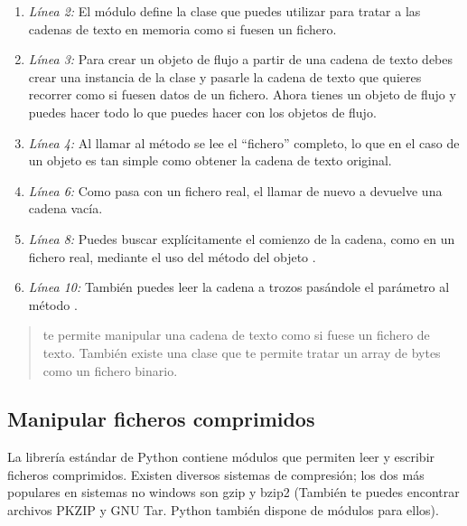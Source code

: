\begin{enumerate}

\item \emph{Línea 2:} El módulo  define la clase  que puedes utilizar para tratar a las cadenas de texto en memoria como si fuesen un fichero.

\item \emph{Línea 3:} Para crear un objeto de flujo a partir de una cadena de texto debes crear una instancia de la clase  y pasarle la cadena de texto que quieres recorrer como si fuesen datos de un fichero. Ahora tienes un objeto de flujo y puedes hacer todo lo que puedes hacer con los objetos de flujo.

\item \emph{Línea 4:} Al llamar al método  se lee el ``fichero'' completo, lo que en el caso de un objeto  es tan simple como obtener la cadena de texto original.

\item \emph{Línea 6:} Como pasa con un fichero real, el llamar de nuevo a  devuelve una cadena vacía.

\item \emph{Línea 8:} Puedes buscar explícitamente el comienzo de la cadena, como en un fichero real, mediante el uso del método  del objeto .

\item \emph{Línea 10:} También puedes leer la cadena a trozos pasándole el parámetro  al método .

\end{enumerate}

\begin{quote}
 te permite manipular una cadena de texto como si fuese un fichero de texto. También existe una clase  que te permite tratar un array de bytes como un fichero binario.
\end{quote}

\subsection{Manipular ficheros comprimidos}

La librería estándar de Python contiene módulos que permiten leer y escribir ficheros comprimidos. Existen diversos sistemas de compresión; los dos más populares en sistemas no windows son gzip y bzip2 (También te puedes encontrar archivos PKZIP y GNU Tar. Python también dispone de módulos para ellos).

